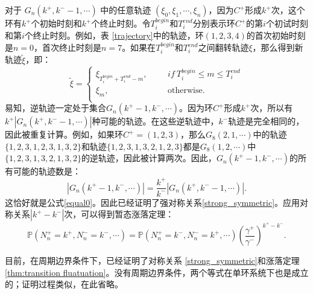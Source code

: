 对于 $G_n(k^+,k^- -1,\cdots)$ 中的任意轨迹 $(\xi_0,\xi_1,\cdots,\xi_n)$，因为$C^+$形成$k^+$次，这个环有$k^+$个初始时刻和$k^+$个终止时刻。令$T_i^{begin}$和$T_i^{end}$分别表示环$C^+$的第$i$个初试时刻和第$i$个终止时刻。例如，表 \ref{trajectory}中的轨迹，环$(1,2,3,4)$的首次初始时刻是$n=0$，首次终止时刻是$n=7$。如果在$T_i^{begin}$和$T_i^{end}$之间翻转轨迹$\xi$，那么得到新轨迹$\tilde{\xi}$，即：
\begin{equation*}
    \tilde{\xi}
    =\left\{\begin{aligned}
        \xi_{T_i^{begin}+T_i^{end}-m},&   &&if ~ T_i^{begin} \le m \le T_i^{end}\\
        \xi_m, &   && \text{otherwise}.\\
        \end{aligned}\right.
\end{equation*}
易知，逆轨迹一定处于集合$G_n(k^+ -1,k^-,\cdots)$。因为环$C^+$形成$k^+$次，所以有$k^+|G_n(k^+,k^- -1, \cdots)|$种可能的轨迹。在这些逆轨迹中，$k^-$轨迹是完全相同的，因此被重复计算。例如，如果环$C^+=(1,2,3)$，那么$G_8(2,1,\cdots)$中的轨迹$\{1,2,3,1,2,3,1,3,2\}$和轨迹$\{1,2,3,1,3,2,1,2,3\}$都是$G_8(1,2,\cdots)$中$\{1,2,3,1,3,2,1,3,2\}$的逆轨迹，因此被计算两次。因此，$G_n(k^+ -1,k^-,\cdots)$的所有可能的轨迹数是：
\begin{equation}\label{equal}
    |G_n(k^+ -1,k^-,\cdots)| = \frac{k^+}{k^-}|G_n(k^+,k^- -1,\cdots)|.
\end{equation}
这恰好就是公式\ref{equal0}。因此已经证明了强对称关系\ref{strong_symmetric}。应用对称关系$|k^+ -k^-|$次，可以得到暂态涨落定理：
\begin{equation}\label{theorem:transient fluatuation}
	\mathbb{P}\left(N^+_n=k^+,N^-_n=k^-,\cdots\right)
	= \mathbb{P}\left(N^+_n=k^-,N^-_n=k^+,\cdots\right)\left(\frac{\gamma^+}{\gamma^-}\right)^{k^+-k^-}.
\end{equation}

目前，在周期边界条件下，已经证明了对称关系 \ref{strong_symmetric}和涨落定理 \ref{thm:transition fluatuation}。没有周期边界条件，两个等式在单环系统下也是成立的；证明过程类似，在此省略。

